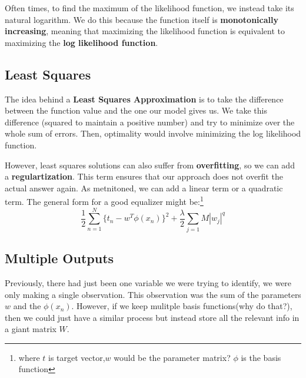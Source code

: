 \documentclass{tufte-handout}
\begin{document}
	Often times, to find the maximum of the likelihood function, we instead take its natural
	logarithm. We do this because the function itself is \textbf{monotonically increasing},
	meaning that maximizing the likelihood function is equivalent to maximizing the 
	\textbf{log likelihood function}.
	\subsection{Least Squares}
	The idea behind a \textbf{Least Squares Approximation} is to take the difference between the 
	function value and the one our model gives us. We take this difference (squared to maintain a
	positive number) and try to minimize over the whole sum of errors. Then, optimality would involve
	minimizing the log likelihood function.

	However, least squares solutions can also suffer from \textbf{overfitting}, so we can add
	a \textbf{regulartization}. This term ensures that our approach does not overfit the actual
	answer again. As metnitoned, we can add a linear term or a quadratic term. The general form 
	for a good equalizer might be:\footnote{where $t$ is target vector,$w$ would be the 
	parameter matrix? $\phi$ is the basis function}
	\[ \frac{1}{2}\sum_{n=1}^{N}\{t_{n}-w^{T}\phi(x_{n})\}^{2}+ \frac{\lambda}{2}\sum_{j=1}{M}|w_{j}|^{q} \]
	\subsection{Multiple Outputs}
	Previously, there had just been one variable we were trying to identify, we were only making a single
	observation. This observation was the sum of the parameters $w$ and the $\phi(x_{n})$. However, if we 
	keep mulitple basis functions(why do that?), then we could just have a similar process but instead store
	all the relevant info in a giant matrix $W$.
\end{document}
